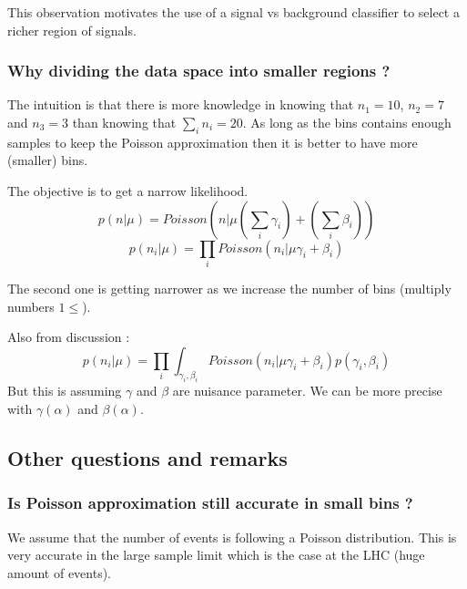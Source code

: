 This observation motivates the use of a signal vs background classifier to select a richer region of signals. 




\subsubsection{Why dividing the data space into smaller regions ?}


The intuition is that there is more knowledge in knowing that $n_1 = 10$, $n_2 = 7$ and $n_3 = 3$ than knowing that $\sum_i n_i = 20$.
As long as the bins contains enough samples to keep the Poisson approximation then it is better to have more (smaller) bins.

The objective is to get a narrow likelihood.
\begin{equation}
    p(n | \mu) = Poisson(n | \mu (\sum_i \gamma_i) + (\sum_i \beta_i))
\end{equation}
\begin{equation}
    p({n_i} | \mu) = \prod_i Poisson(n_i | \mu \gamma_i + \beta_i)
\end{equation}

The second one is getting narrower as we increase the number of bins (multiply numbers $ 1 \leq $).

Also from discussion :
\begin{equation}
    p({n_i} | \mu) = \prod_i \int_{\gamma_i, \beta_i} Poisson(n_i | \mu \gamma_i + \beta_i) p(\gamma_i, \beta_i)
\end{equation}
But this is assuming $\gamma$ and $\beta$ are nuisance parameter.
We can be more precise with $\gamma(\alpha)$ and $\beta(\alpha)$.



\subsection{Other questions and remarks} %
\label{sub:other_questions_and_remarks}

\subsubsection{Is Poisson approximation still accurate in small bins ?} %

We assume that the number of events is following a Poisson distribution.
This is very accurate in the large sample limit which is the case at the LHC (huge amount of events).

